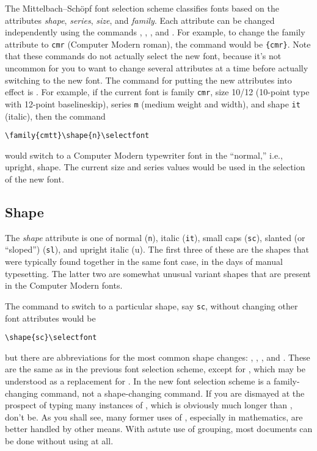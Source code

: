 The Mittelbach--Sch\"opf font selection scheme classifies fonts
based on the attributes
{\em shape}, {\em series}, {\em size}, and {\em family}.
Each attribute can be changed independently using the commands
, , , and .
For example, to change the family attribute to {\tt cmr} (Computer
Modern roman),
the command would be \verb={cmr}=.
Note that these commands do
not actually select the new font, because it's not uncommon
for you to want to change several attributes at a time
before actually switching to the new font.  The command
for putting the new attributes into effect is .
For example, if the current font is family {\tt cmr},
size 10/12
(10-point type with 12-point baselineskip), series {\tt m} (medium
weight and width), and shape {\tt it} (italic), then the command
\begin{verbatim}
\family{cmtt}\shape{n}\selectfont
\end{verbatim}
would switch to a Computer Modern typewriter font
in the ``normal,'' i.e., upright, shape.  The current size and series
values would be used in the selection of the new font.

\subsection{Shape}
The {\em shape} attribute is one of normal ({\tt n}),
italic ({\tt it}), small caps ({\tt sc}),
slanted (or ``sloped'') ({\tt sl}), and upright italic ({u}).  The
first three of these are the shapes that were typically found
together in the same font case, in the days of manual typesetting.
The latter two are somewhat unusual
variant shapes that are present in the Computer
Modern fonts.

The command to switch to a particular shape, say {\tt sc},
without changing other font attributes would be
\begin{verbatim}
\shape{sc}\selectfont
\end{verbatim}
but there are abbreviations for the most common shape changes:
, , , and .  These are
the same as in the previous font selection scheme, except for
, which may be understood as a replacement for
.  In the new font selection scheme  is a family-changing
command, not a shape-changing command.  If you are dismayed at
the prospect of typing many instances of , which
is obviously much longer than , don't be.  As you shall
see, many former uses of , especially in mathematics,
are better handled by other means.  With astute use of grouping,
most documents can be done without using  at all.


